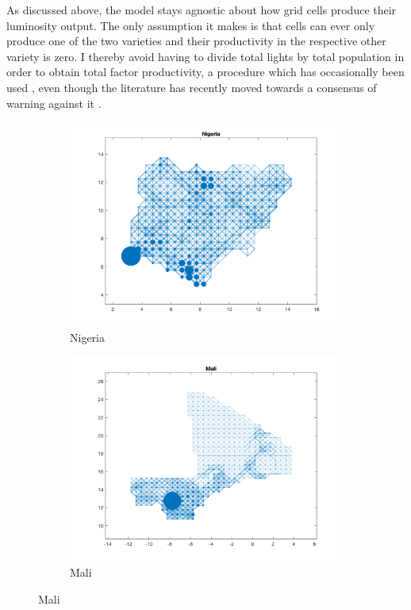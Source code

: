 \documentclass[11pt, oneside]{article}   	%
\begin{document}
As discussed above, the model stays agnostic about how grid cells produce their luminosity output. The only assumption it makes is that cells can ever only produce one of the two varieties and their productivity in the respective other variety is zero. I thereby avoid having to divide total lights by total population in order to obtain total factor productivity, a procedure which has occasionally been used \citep[see e.g.][]{DeLuca_Ethnicfavoritismaxiom_2018}, even though the literature has recently moved towards a consensus of warning against it \citep{Michalopoulos_SpatialPatternsDevelopment_2018}.

\begin{figure}[t]
\centering
\caption{Discretised Networks for Different Countries}

\begin{subfigure}[c]{0.45\textwidth}
\includegraphics[width=\textwidth, trim={2cm 1cm 1.5cm 0cm},clip]{../../Build/output/Matlab_graphs/Nicer_graphs/Nigeria_stat.png}
\caption{Nigeria}
\label{fig:nigeria_mat}
\end{subfigure}
\begin{subfigure}[c]{0.45\textwidth}
\includegraphics[width=\textwidth, trim={2cm 1cm 1.5cm 0cm},clip]{../../Build/output/Matlab_graphs/Nicer_graphs/Mali_stat.png}
\caption{Mali}
\label{fig:Mali_mat}
\end{subfigure}


\end{figure}
\end{document}
